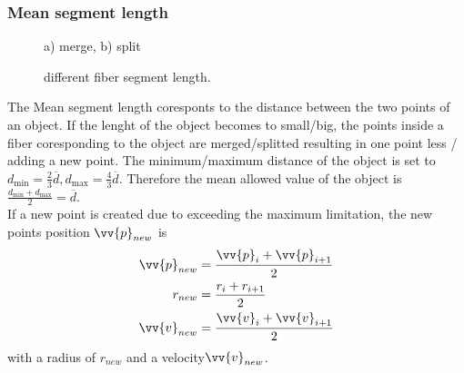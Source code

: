 \subsubsection{Mean segment length}
% 
\begin{figure}[!tb]
    
	\caption{a) merge, b) split}
	\label{fig:merge_split}
\end{figure}
% 
% 
\begin{figure}[!tb]
    \centering
	\caption{different fiber segment length.}
	\label{fig:model_length}
\end{figure}
% 
The Mean segment length coresponts to the distance between the two points of an object.
If the lenght of the object becomes to small/big, the points inside a fiber coresponding to the object are merged/splitted resulting in one point less / adding a new point.
The minimum/maximum distance of the object is set to $d_{\min} = \frac{2}{3} \overline{d}, d_{\max} = \frac{4}{3}\overline{d}$.
Therefore the mean allowed value of the object is $\frac{d_{\min} + d_{\max}}{2} = \overline{d}$. \\
% 
If a new point is created due to exceeding the maximum limitation, the new points position $\vv{p}_{new}$ is 
\begin{align}
\begin{split}
\vv{p}_{new} &= \frac{\vv{p}_{i} + \vv{p}_{i+1}}{2}\\
r_{new} &= \frac{r_{i} + r_{i+1}}{2}\\
\vv{v}_{new} &= \frac{\vv{v}_{i} + \vv{v}_{i+1}}{2}
\end{split}
\end{align}
with a radius of $r_{new}$ and a velocity$\vv{v}_{new}$.
% 
